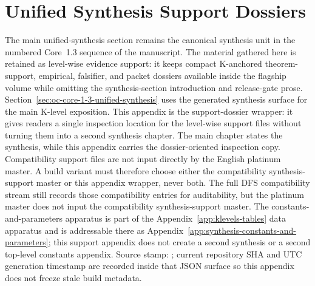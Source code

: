 \section{Unified Synthesis Support Dossiers}
\label{sec:oc-core-1-3-synthesis-support-dossiers}

The main unified-synthesis section remains the canonical synthesis unit in the
numbered Core~1.3 sequence of the manuscript.
The material gathered here is retained as level-wise evidence support: it keeps
compact K-anchored theorem-support, empirical, falsifier, and packet dossiers
available inside the flagship volume while omitting the synthesis-section
introduction and release-gate prose.
Section~\ref{sec:oc-core-1-3-unified-synthesis} uses the generated synthesis
surface for the main K-level exposition. This appendix is the support-dossier
wrapper: it gives readers a single inspection location for the level-wise
support files without turning them into a second synthesis chapter. The main
chapter states the synthesis, while this appendix carries the dossier-oriented
inspection copy. Compatibility support files are not input directly by the
English platinum master. A build variant must therefore choose either the
compatibility synthesis-support master or this appendix wrapper, never both.
The full DFS compatibility stream still records those compatibility entries for
auditability, but the platinum master does not input the compatibility
synthesis-support master. The constants-and-parameters apparatus is part of the
Appendix~\ref{app:klevels-tables} data apparatus and is addressable there as
Appendix~\ref{app:synthesis-constants-and-parameters}; this support appendix
does not create a second synthesis or a second top-level constants appendix.
Source stamp:
;
current repository SHA and UTC generation timestamp are recorded inside that JSON
surface so this appendix does not freeze stale build metadata.


